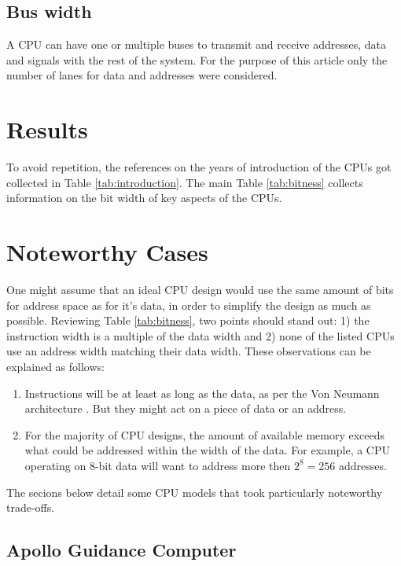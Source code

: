 \documentclass[twoside,twocolumn]{article}
\begin{document}
\subsection{Bus width}

A CPU can have one or multiple buses to transmit and receive addresses, data and signals
with the rest of the system. For the purpose of this article only the number of lanes for
data and addresses were considered.


\section{Results}

To avoid repetition, the references on the years of introduction of the CPUs got
collected in Table \ref{tab:introduction}. The main Table \ref{tab:bitness} collects
information on the bit width of key aspects of the CPUs.


\section{Noteworthy Cases}

One might assume that an ideal CPU design would use the same amount of bits for address
space as for it's data, in order to simplify the design as much as possible. Reviewing
Table \ref{tab:bitness}, two points should stand out: 1) the instruction width is a
multiple of the data width and 2) none of the listed CPUs use an address width matching
their data width. These observations can be explained as follows:

\begin{enumerate}[1)]
\item Instructions will be at least as long as the data, as per the Von Neumann
architecture \cite{edvac}. But they might act on a piece of data or an address.
\item For the majority of CPU designs, the amount of available memory exceeds what could
be addressed within the width of the data. For example, a CPU operating on 8-bit data
will want to address more then $2^8 = 256$ addresses.
\end{enumerate}

The secions below detail some CPU models that took particularly noteworthy trade-offs.

\subsection{Apollo Guidance Computer}
\end{document}
